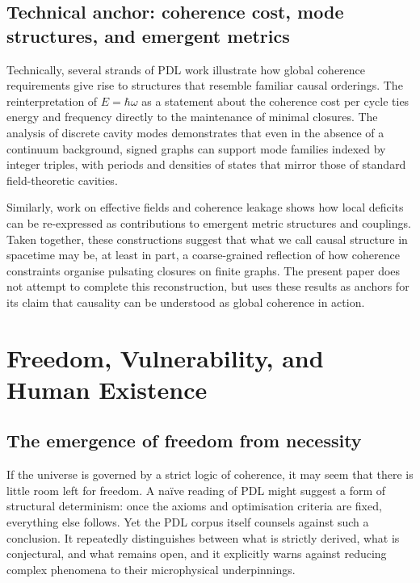 \documentclass[11pt,a4paper]{article}
\theoremstyle{definition}
\begin{document}
\subsection{Technical anchor: coherence cost, mode structures, and emergent metrics}

Technically, several strands of PDL work illustrate how global coherence requirements give rise to structures that resemble familiar causal orderings. The reinterpretation of \(E = \hbar \omega\) as a statement about the coherence cost per cycle ties energy and frequency directly to the maintenance of minimal closures.\cite{Laubscher_EmergencePhysicalReality_2024,Laubscher_Schrodinger_Compat_v2_2024} The analysis of discrete cavity modes demonstrates that even in the absence of a continuum background, signed graphs can support mode families indexed by integer triples, with periods and densities of states that mirror those of standard field-theoretic cavities.\cite{Laubscher_CavityModes_PDL_2024}

Similarly, work on effective fields and coherence leakage shows how local deficits can be re-expressed as contributions to emergent metric structures and couplings.\cite{Laubscher_EffectiveFields_2024,Laubscher_UniversalCoherenceLeakage_2024} Taken together, these constructions suggest that what we call causal structure in spacetime may be, at least in part, a coarse-grained reflection of how coherence constraints organise pulsating closures on finite graphs. The present paper does not attempt to complete this reconstruction, but uses these results as anchors for its claim that causality can be understood as global coherence in action.

\section{Freedom, Vulnerability, and Human Existence}
\label{sec:freedom_human}

\subsection{The emergence of freedom from necessity}

If the universe is governed by a strict logic of coherence, it may seem that there is little room left for freedom. A naïve reading of PDL might suggest a form of structural determinism: once the axioms and optimisation criteria are fixed, everything else follows. Yet the PDL corpus itself counsels against such a conclusion. It repeatedly distinguishes between what is strictly derived, what is conjectural, and what remains open, and it explicitly warns against reducing complex phenomena to their microphysical underpinnings.\cite{Laubscher_Existence_PulsatingClosure_2026,Laubscher_PDL_Position_2024}
\end{document}
